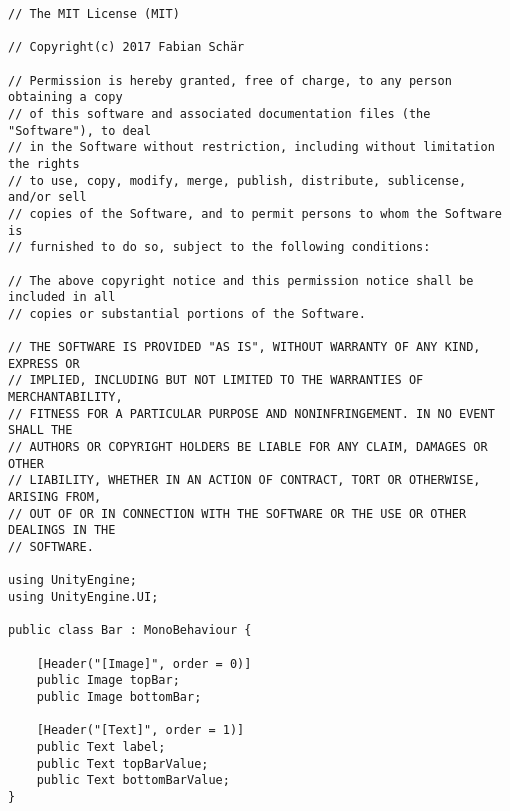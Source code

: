\begin{lstlisting}[caption={/Assets/Scripts/Charts/Bar.cs}, label={lst:scripts_charts_bar}]
// The MIT License (MIT)

// Copyright(c) 2017 Fabian Schär

// Permission is hereby granted, free of charge, to any person obtaining a copy
// of this software and associated documentation files (the "Software"), to deal
// in the Software without restriction, including without limitation the rights
// to use, copy, modify, merge, publish, distribute, sublicense, and/or sell
// copies of the Software, and to permit persons to whom the Software is
// furnished to do so, subject to the following conditions:

// The above copyright notice and this permission notice shall be included in all
// copies or substantial portions of the Software.

// THE SOFTWARE IS PROVIDED "AS IS", WITHOUT WARRANTY OF ANY KIND, EXPRESS OR
// IMPLIED, INCLUDING BUT NOT LIMITED TO THE WARRANTIES OF MERCHANTABILITY,
// FITNESS FOR A PARTICULAR PURPOSE AND NONINFRINGEMENT. IN NO EVENT SHALL THE
// AUTHORS OR COPYRIGHT HOLDERS BE LIABLE FOR ANY CLAIM, DAMAGES OR OTHER
// LIABILITY, WHETHER IN AN ACTION OF CONTRACT, TORT OR OTHERWISE, ARISING FROM,
// OUT OF OR IN CONNECTION WITH THE SOFTWARE OR THE USE OR OTHER DEALINGS IN THE
// SOFTWARE.

using UnityEngine;
using UnityEngine.UI;

public class Bar : MonoBehaviour {

	[Header("[Image]", order = 0)]
	public Image topBar;
	public Image bottomBar;
	
	[Header("[Text]", order = 1)]
	public Text label;
	public Text topBarValue;
	public Text bottomBarValue;
}
\end{lstlisting}


